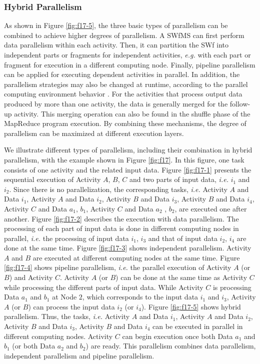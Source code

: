\subsubsection*{Hybrid Parallelism}

As shown in Figure \ref{fig:f17-5}, the three basic types of parallelism
can be combined to achieve higher degrees of parallelism. A SWfMS can first perform data parallelism within each activity. 
Then, it can partition the SWf into independent parts or fragments for independent activities,
\textit{e.g.} with each part or fragment for execution in a different computing node.
Finally, pipeline parallelism can be applied for executing dependent activities in parallel. 
In addition, the parallelism strategies may also be changed at runtime, according to the parallel computing environment behavior \cite{Oliveira2012a}.
For the activities that process output data produced by more than one activity, the data is 
generally merged for the follow-up activity. This merging operation can also be found in the 
shuffle phase of the MapReduce program execution. By combining these mechanisms, the degree of parallelism
can be maximized at different execution layers. 


We illustrate different types of parallelism, including their
combination in hybrid parallelism, with the example shown in Figure
\ref{fig:f17}. In this figure, one task consists of one activity and
the related input data. Figure \ref{fig:f17-1} presents the sequential
execution of Activity $A$, $B$, $C$ and two parts of input data,
\textit{i.e.} $i_1$ and $i_2$. Since there is no parallelization, the
corresponding tasks, \textit{i.e.} Activity $A$ and
Data $i_1$, Activity $A$
and Data $i_2$, Activity $B$ and Data $i_3$,  Activity $B$ and Data
$i_4$, Activity $C$ and Data $a_1$, $b_1$, Activity $C$ and Data $a_2$
, $b_2$, are executed one after another. Figure \ref{fig:f17-2}
describes the execution with data parallelism. The processing of each
part of input data is done in different computing nodes in
parallel, \textit{i.e.} the processing of input data $i_1$, $i_3$ and that of
input data $i_2$, $i_4$ are done at the same time. Figure
\ref{fig:f17-3} shows independent parallelism. Activity $A$ and
$B$ are executed at different computing nodes at the same time. Figure
\ref{fig:f17-4} shows pipeline parallelism, \textit{i.e.} the parallel
execution of Activity $A$ (or $B$) and Activity $C$. Activity $A$ (or
$B$) can be done at the same time as Activity $C$ while processing
the different parts of input data. While Activity $C$ is processing
Data $a_1$ and $b_1$ at Node $2$, which corresponds to the input data
$i_1$ and $i_3$, Activity $A$ (or $B$) can process the input data
$i_2$ (or $i_4$). Figure \ref{fig:f17-5} shows hybrid
parallelism. Thus, the tasks, \textit{i.e.} Activity $A$ and Data $i_1$,
Activity $A$ and Data $i_2$, Activity $B$ and Data $i_3$, Activity $B$
and Data $i_4$ can be executed in parallel in different computing
nodes. Activity $C$ can begin execution once both Data $a_1$ and $b_1$
(or both Data $a_2$ and $b_2$) are ready. This parallelism combines
data parallelism, independent parallelism and pipeline parallelism.
 
